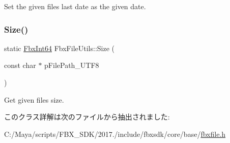 Set the given file\textquotesingle{}s last date as the given date. 

\mbox{\label{class_fbx_file_utils_af146d0591ec4ec528b489b8b4cf60db2}} 
\subsubsection{\texorpdfstring{Size()}{Size()}}
{\footnotesize\ttfamily static \hyperlink{fbxtypes_8h_ac7e1334c7c6aacc9c8a9dccddebb4368}{Fbx\+Int64} Fbx\+File\+Utils\+::\+Size (\begin{DoxyParamCaption}\item[{const char $\ast$}]{p\+File\+Path\+\_\+\+U\+T\+F8 }\end{DoxyParamCaption})\hspace{0.3cm}{\ttfamily [static]}}



Get given file\textquotesingle{}s size. 



このクラス詳解は次のファイルから抽出されました\+:\begin{DoxyCompactItemize}
\item 
C\+:/\+Maya/scripts/\+F\+B\+X\+\_\+\+S\+D\+K/2017./include/fbxsdk/core/base/\hyperlink{fbxfile_8h}{fbxfile.\+h}\end{DoxyCompactItemize}
